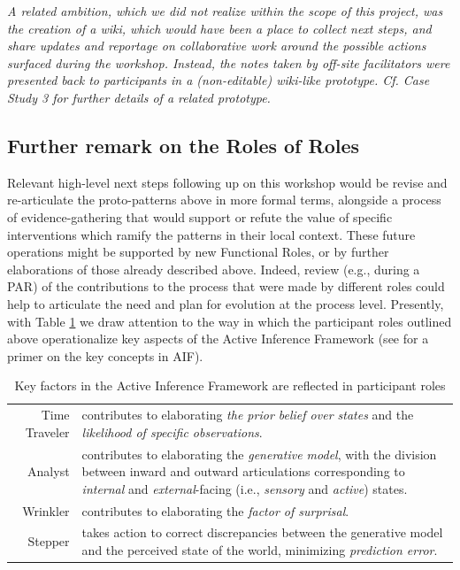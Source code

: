 \documentclass[acmlarge,timestamp]{acmart}
\begin{document}


\noindent \emph{A related ambition, which we did not realize within
the scope of this project, was the creation of a wiki, which would
have been a place to collect next steps, and share updates and
reportage on collaborative work around the possible actions surfaced
during the workshop.  Instead, the notes taken by off-site
facilitators were presented back to participants in a (non-editable)
wiki-like prototype. Cf. Case Study 3 for further details of a related
prototype.}

\subsection{Further remark on the Roles of Roles}\label{role-of-roles}
Relevant high-level next steps following up on this workshop would be
revise and re-articulate the proto-patterns above in more formal
terms, alongside a process of evidence-gathering that would support or
refute the value of specific interventions which ramify the patterns
in their local context.  These future operations might be supported by
new {\sc Functional Roles}, or by further elaborations of those
already described above.  Indeed, review (e.g., during a PAR) of the
contributions to the process that were made by different roles could
help to articulate the need and plan for evolution at the process
level.  Presently, with Table \ref{active-inference-factors} we draw
attention to the way in which the participant roles outlined above
operationalize key aspects of the Active Inference Framework (see
\citet{SMITH2022102632} for a primer on the key concepts in AIF).


{
\renewcommand*{\arraystretch}{1.2}
\begin{table}[h]
\begin{tabular}{rp{}}
{\sc Time Traveler} & contributes to elaborating \emph{the prior
belief over states} and the \emph{likelihood of specific
observations}.\\

{\sc  Analyst} & contributes to elaborating the \emph{generative model}, with the division between inward and outward articulations corresponding to \emph{internal} and \emph{external}-facing (i.e., \emph{sensory} and \emph{active}) states.\\

{\sc Wrinkler} & contributes to elaborating the \emph{factor of surprisal}.\\
{\sc Stepper} & takes action to correct discrepancies between the generative model and the perceived state of the world, minimizing \emph{prediction error}.
\end{tabular}
\caption{Key factors in the Active Inference Framework are reflected in participant roles\label{active-inference-factors}}
\end{table}
}
\end{document}
